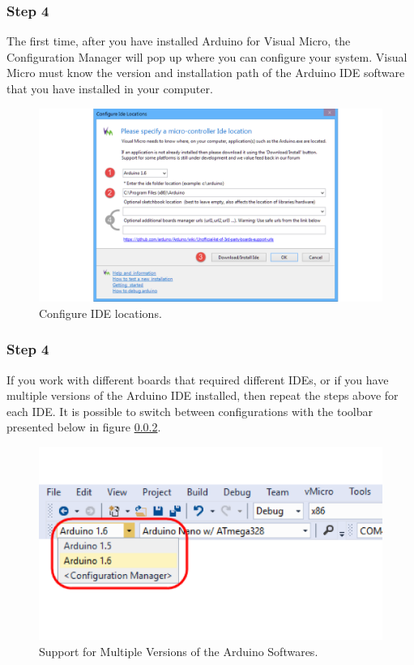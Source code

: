 \begin{refsection}
	\subsubsection{Step 4}
	
	The first time, after you have installed Arduino for Visual Micro, the Configuration Manager will pop up where you can configure your system. Visual Micro must know the version and installation path of the Arduino IDE software that you have installed in your computer.
	
	\begin{figure}[H]
		\centering
		\includegraphics[width=1\linewidth]{./sdf/arduino_quantum_rx/figures/configureIDE.pdf}
		\caption{Configure IDE locations.}
		\label{configureIDE}
	\end{figure}
	
	\subsubsection{Step 4}
	If you work with different boards that required different IDEs, or if you have multiple versions of the Arduino IDE installed, then repeat the steps above for each IDE. It is possible to switch between configurations with the toolbar presented below in figure \ref{}.
	
	\begin{figure}[H]
		\centering
		\includegraphics[width=0.7\linewidth]{./sdf/arduino_quantum_rx/figures/multipleIDEversions.pdf}
		\caption{Support for Multiple Versions of the Arduino Softwares.}
		\label{multipleIDEversions}
	\end{figure}
	

\end{refsection}
